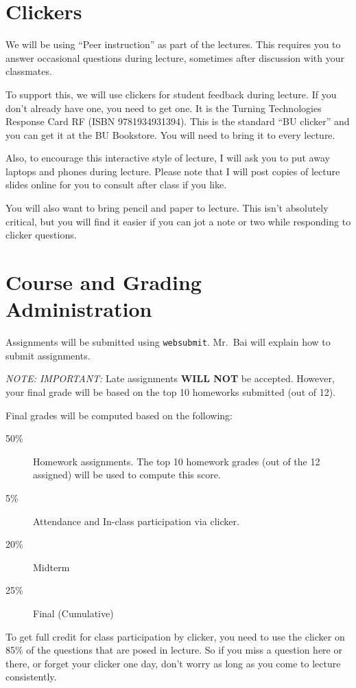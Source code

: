 \documentclass[11pt]{article}
\begin{document}
\section*{Clickers}

We will be using ``Peer instruction'' as part of the lectures.  This
requires you to answer occasional questions during lecture, sometimes
after discussion with your classmates.   

To support this, we will use clickers for student feedback during lecture.  If you
don't already have one, you need to get one.  It is the Turning
Technologies Response Card RF (ISBN 9781934931394).  This is the
standard ``BU clicker'' and you can get it at
the BU Bookstore.   You will need to bring it to every lecture.

Also, to encourage this interactive style of lecture, I will ask you to
put away laptops and phones during lecture.    Please note that I will
post copies of lecture slides online for you to consult after class if
you like.

You will also want to bring pencil and paper to lecture.   This isn't
absolutely critical, but you will find it easier if you can jot a note
or two while responding to clicker questions.

\section*{Course and Grading Administration}

Assignments will be submitted using \texttt{websubmit}.   Mr.\ Bai will
explain how to submit assignments.  

\emph{NOTE: IMPORTANT:} Late assignments \textbf{WILL NOT} be accepted.   However, your final
grade will be based on the top 10 homeworks submitted (out of 12).   

Final grades will be computed based on the following:
\begin{description}
\item[50\%] Homework assignments.  The top 10 homework grades (out of the
  12 assigned) will be used to compute this score.
\item[5\%] Attendance and In-class participation via clicker.
\item[20\%] Midterm
\item[25\%] Final (Cumulative)
\end{description}

To get full credit for class participation by clicker, you need to use
the clicker on 85\% of the questions that are posed in lecture.   So if
you miss a question here or there, or forget your clicker one day, don't
worry as long as you come to lecture consistently.
\end{document}
